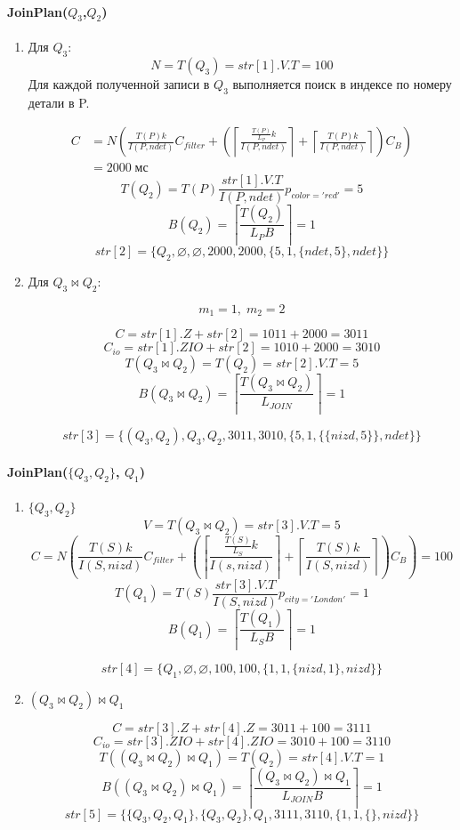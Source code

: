 \documentclass[russian,utf8,emptystyle]{eskdtext}
\begin{document}
\paragraph{JoinPlan($Q_3$,$Q_2$)}
\begin{enumerate}[label=\arabic*.]
\item Для $Q_3$:
$$
N = T(Q_3) = str[1].V.T = 100
$$
Для каждой полученной записи в $Q_3$ выполняется поиск в индексе по номеру детали в P.

\begin{align*}
C &= N \left( \frac{T(P)k}{I(P,ndet)}C_{filter} + \left(\left\lceil \frac{\frac{T(P)}{L_P}k}{I(P,ndet)} \right\rceil + \left\lceil \frac{T(P)k}{I(P,ndet)} \right\rceil \right) C_B \right) \\ 
&= 2000 \; \text{мс}
\end{align*}
$$
T(Q_2) = T(P) \frac{str[1].V.T}{I(P,ndet)} p_{color='red'} = 5
$$
$$
B(Q_2) = \left\lceil \frac{T(Q_2)}{L_P B} \right\rceil = 1
$$
$$
str[2] = \{Q_2, \varnothing, \varnothing, 2000, 2000, \{ 5, 1, \{ ndet, 5\}, ndet\}\}
$$

\item Для $Q_3 \bowtie Q_2$:

$$
m_1 = 1, \; m_2 = 2
$$

$$
C = str[1].Z + str[2] = 1011 + 2000 = 3011
$$
$$
C_{io} = str[1].ZIO + str[2] = 1010 + 2000 = 3010
$$
$$
T(Q_3 \bowtie Q_2) = T(Q_2) = str[2].V.T = 5
$$
$$
B(Q_3 \bowtie Q_2) = \left\lceil \frac{T(Q_3 \bowtie Q_2)}{L_{JOIN}} \right\rceil = 1
$$

$$
str[3] = \{ (Q_3, Q_2), Q_3, Q_2, 3011, 3010, \{ 5, 1, \{ \{ nizd, 5 \}\}, ndet\} \}
$$
\end{enumerate}

\paragraph{JoinPlan($\{Q_3, Q_2\}$, $Q_1$)}

\begin{enumerate}[label=\arabic*.]
\item $\{ Q_3, Q_2 \}$
$$
V = T(Q_3 \bowtie Q_2) = str[3].V.T = 5
$$
$$
C = N\left(\frac{T(S)k}{I(S,nizd)}C_{filter} + \left( \left\lceil \frac{\frac{T(S)}{L_S} k}{I(s, nizd)} \right\rceil + \left\lceil \frac{T(S)k}{I(S,nizd)}\right\rceil \right)C_B\right) = 100
$$
$$
T(Q_1) = T(S) \frac{str[3].V.T}{I(S,nizd)}p_{city='London'} = 1
$$
$$
B(Q_1) = \left\lceil \frac{T(Q_1)}{L_S B} \right\rceil = 1
$$

$$
str[4] = \{ Q_1, \varnothing, \varnothing, 100, 100, \{ 1, 1, \{ nizd, 1\}, nizd\}\}
$$

\item $ (Q_3 \bowtie Q_2) \bowtie Q_1 $

$$
C = str[3].Z + str[4].Z = 3011 + 100 = 3111
$$
$$
C_{io} = str[3].ZIO + str[4].ZIO = 3010 + 100 = 3110
$$
$$
T((Q_3 \bowtie Q_2) \bowtie Q_1) = T(Q_2) = str[4].V.T = 1
$$
$$
B((Q_3 \bowtie Q_2) \bowtie Q_1) = \left\lceil \frac{(Q_3 \bowtie Q_2) \bowtie Q_1}{L_{JOIN} B} \right\rceil = 1
$$
$$
str[5] = \{ \{ Q_3, Q_2, Q_1 \},  \{ Q_3, Q_2 \}, Q_1, 3111, 3110, \{ 1, 1, \{ \}, nizd\}\}
$$
\end{enumerate}
\end{document}

